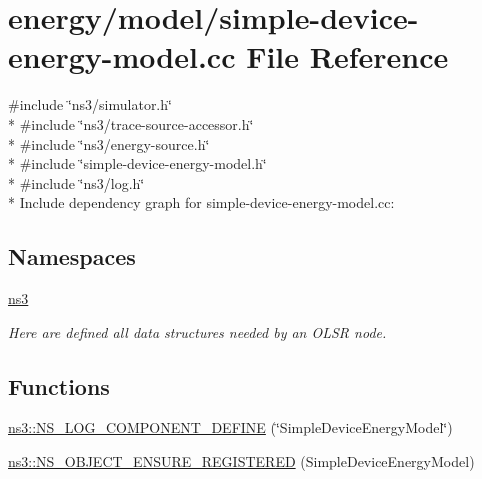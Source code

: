 \hypertarget{simple-device-energy-model_8cc}{}\section{energy/model/simple-\/device-\/energy-\/model.cc File Reference}
\label{simple-device-energy-model_8cc}
{\ttfamily \#include \char`\"{}ns3/simulator.\+h\char`\"{}}\\*
{\ttfamily \#include \char`\"{}ns3/trace-\/source-\/accessor.\+h\char`\"{}}\\*
{\ttfamily \#include \char`\"{}ns3/energy-\/source.\+h\char`\"{}}\\*
{\ttfamily \#include \char`\"{}simple-\/device-\/energy-\/model.\+h\char`\"{}}\\*
{\ttfamily \#include \char`\"{}ns3/log.\+h\char`\"{}}\\*
Include dependency graph for simple-\/device-\/energy-\/model.cc\+:
\subsection*{Namespaces}
\begin{DoxyCompactItemize}
\item 
 \hyperlink{namespacens3}{ns3}
\begin{DoxyCompactList}\small\item\em Here are defined all data structures needed by an O\+L\+SR node. \end{DoxyCompactList}\end{DoxyCompactItemize}
\subsection*{Functions}
\begin{DoxyCompactItemize}
\item 
\hyperlink{namespacens3_a30905b45338a90372a72ff64eb397fab}{ns3\+::\+N\+S\+\_\+\+L\+O\+G\+\_\+\+C\+O\+M\+P\+O\+N\+E\+N\+T\+\_\+\+D\+E\+F\+I\+NE} (\char`\"{}Simple\+Device\+Energy\+Model\char`\"{})
\item 
\hyperlink{namespacens3_a47ac28d5e9f801371001faa0c009a33f}{ns3\+::\+N\+S\+\_\+\+O\+B\+J\+E\+C\+T\+\_\+\+E\+N\+S\+U\+R\+E\+\_\+\+R\+E\+G\+I\+S\+T\+E\+R\+ED} (Simple\+Device\+Energy\+Model)
\end{DoxyCompactItemize}
